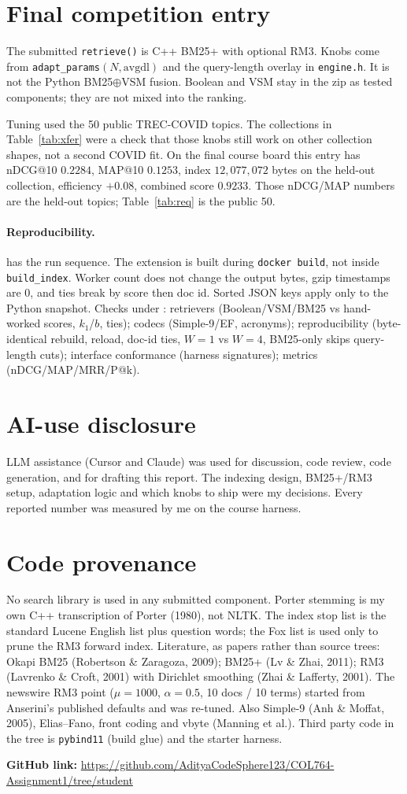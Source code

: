 \documentclass[10pt,a4paper]{article}
\begin{document}
\section{Final competition entry}
The submitted \texttt{retrieve()} is C++ BM25+ with optional RM3. Knobs come from
\texttt{adapt\_params}$(N,\mathrm{avgdl})$ and the query-length overlay in
\texttt{engine.h}. It is not the Python BM25$\oplus$VSM fusion. Boolean and VSM stay
in the zip as tested components; they are not mixed into the ranking.

Tuning used the 50 public TREC-COVID topics. The collections in
Table~\ref{tab:xfer} were a check that those knobs still work on other collection
shapes, not a second COVID fit. On the final course board this entry has
nDCG@10 $0.2284$, MAP@10 $0.1253$, index $12{,}077{,}072$ bytes on the
held-out collection,
efficiency ${+}0.08$, combined score $0.9233$. Those nDCG/MAP numbers are the
held-out topics; Table~\ref{tab:req} is the public 50.

\paragraph{Reproducibility.}  has the run sequence. The extension is
built during \texttt{docker build}, not inside \texttt{build\_index}. Worker count
does not change the output bytes, gzip timestamps are 0, and ties break by score
then doc id. Sorted JSON keys apply only to the Python  snapshot.
Checks under : retrievers (Boolean/VSM/BM25 vs hand-worked scores,
$k_1$/$b$, ties); codecs (Simple-9/EF, acronyms); reproducibility (byte-identical
rebuild, reload, doc-id ties, $W{=}1$ vs $W{=}4$, BM25-only skips query-length
cuts); interface conformance (harness signatures); metrics (nDCG/MAP/MRR/P@k).

\section*{AI-use disclosure}
LLM assistance (Cursor and Claude) was used for discussion,
code review, code generation, and for drafting this report. The indexing design, BM25+/RM3 setup, adaptation logic and which knobs to ship
were my decisions. Every reported number was measured by me on the course harness.

\section*{Code provenance}
No search library is used in any submitted component. Porter stemming is my own
C++ transcription of Porter (1980), not NLTK. The index stop list is the standard
Lucene English list plus question words; the Fox list is used only to prune the
RM3 forward index. Literature, as papers rather than source trees: Okapi BM25
(Robertson \& Zaragoza, 2009); BM25+ (Lv \& Zhai, 2011); RM3 (Lavrenko \& Croft,
2001) with Dirichlet smoothing (Zhai \& Lafferty, 2001). The newswire RM3 point
($\mu{=}1000$, $\alpha{=}0.5$, 10 docs / 10 terms) started from Anserini's
published defaults and was re-tuned. Also Simple-9 (Anh \& Moffat, 2005),
Elias--Fano, front coding and vbyte (Manning et al.). Third party code in the
tree is \texttt{pybind11} (build glue) and the starter harness.

\noindent\textbf{GitHub link:} \url{https://github.com/AdityaCodeSphere123/COL764-Assignment1/tree/student}
\end{document}
